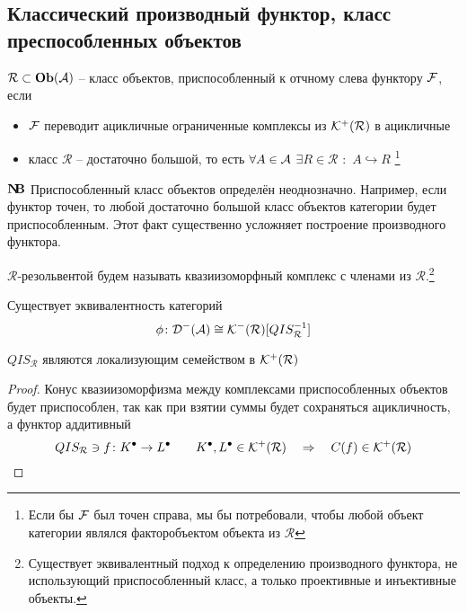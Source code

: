 \documentclass[../main.tex]{subfiles}
\begin{document}
\subsection{Классический производный функтор, класс преспособленных объектов}
\begin{to_def}
    $\mathcal{R} \subset \mathbf{Ob}(\mathcal{A})$ -- класс объектов, приспособленный к отчному слева функтору $\mathcal{F}$, если 
    \begin{itemize}
        \item $\mathcal{F}$ переводит ацикличные ограниченные комплексы из $\mathcal{K^+(R)}$ в ацикличные
        \item класс $\mathcal{R}$ -- достаточно большой, то есть $\forall A \in \mathcal{A}$ $\exists R \in \mathcal{R}$ $\colon$ $A \hookrightarrow R$ \footnote{Если бы $\mathcal{F}$ был точен справа, мы бы потребовали, чтобы любой объект категории являлся факторобъектом объекта из $\mathcal{R}$}
    \end{itemize}
\end{to_def}
$\mathbf{N\kern-0.3em B}$ Приспособленный класс объектов определён неоднозначно. Например, если функтор точен, то любой достаточно большой класс объектов категории будет приспособленным. Этот факт существенно усложняет построение производного функтора.
\begin{to_def}
$\mathcal{R}$-резольвентой будем называть квазиизоморфный комплекс с членами из $\mathcal{R}$.\footnote{Существует эквивалентный подход к определению производного функтора, не использующий приспособленный класс, а только проективные и инъективные объекты.}
\end{to_def}
\begin{to_claim}
Существует эквивалентность категорий
\[\phi \colon \mathcal{D^-(A)} \cong \mathcal{K^-(R)}[QIS_{\mathcal{R}}^{-1}]\]
\end{to_claim}
\begin{to_claim}
 $QIS_{\mathcal{R}}$ являются локализующим семейством в $\mathcal{K^+(R)}$
\end{to_claim}
\begin{proof}
Конус квазиизоморфизма между комплексами приспособленных объектов будет приспособлен, так как при взятии суммы будет сохраняться ацикличность, а функтор аддитивный 
    \[QIS_{\mathcal{R}} \ni f\colon K^\bullet \to L^\bullet \qquad K^\bullet, L^\bullet \in \mathcal{K^+(R)} \quad \Rightarrow \quad C(f) \in \mathcal{K^+(R)}\]
\end{proof}
\end{document}
